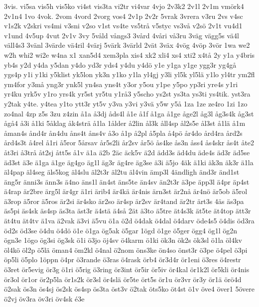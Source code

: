 {3vis.
vi5sa
vis5h
vis5ko
vi4st
vis3ta
vi2tr
vi4var
4vjo
2v3k2
2v1l
2v1m
vm^^f6rk4
2v1n4
1vo
4vok.
2vom
4vord
2vorg
vos4
2v1p
2v2r
5vrak
3vrera
v3ru
2vs
v4sc
v1s2k
v2skri
vs4mi
v3sni
v2so
v1st
vs4te
vs5tr^^e5
v5styc
vs3v^^e5
v2s^^f6
2v1t
vu4d1
v1und
4v5up
4vut
2v1v
3vy
5v^^e5ld
v^^e5ngs3
3v^^e5rd
4v^^e5ri
v^^e53ru
3v^^e4g
v^^e4gg5s
v^^e44l
v^^e4ll4s3
3v^^e4nl
3v^^e4rde
v^^e44ril
4v^^e4rj
5v^^e4rk
3v^^e4rld
2v^^e4t
3v^^e4x
4v^^f6g
4v^^f6p
3v^^f6r
1wa
we2
w2h
whi2
wi2e
w4na
x1
xan5d4
xem3pla
xis4
xk2
xli4
xs4
xti2
x4t^^e5
2y
y1a
y4bris
yb4s
y2d
y4da
y5dan
y4do
yd3r
yds4
y4du
y4d^^f6
y1e
y1ga
y1ge
ygg3r
yg4g^^e5
ygs4p
y1i
y1ki
y5klist
yk5lon
yk3n
y1ko
y1la
yl4gj
y3li
yl5k
yl5l^^e4
y1lo
yl4tr
ym2fl
ym4for
y3m^^e5
yng3r
ynk5l
yn4sa
yns4t
y3or
y5ou
y1pe
y5po
yp3ri
yre4s
y1ri
yr4ku
yrk5v
y1ro
yrs4k
yr5st
yr5tu
y1r^^e53
y5scho
ys2st
ys3ta
ys3ti
ys4tik.
yst3ra
y2tak
y4te.
y4tea
y1to
ytt3r
yt5v
y3va
y3vi
y3v^^e4
y5w
y5^^e5
1za
1ze
ze4ro
1zi
1zo
zo4nal
4zp
z5s
3zu
z4zin
^^e51a
^^e53dj
^^e5ds4l
^^e51e
^^e51f
^^e51ga
^^e51ge
^^e5ge2l
^^e5g3l
^^e5g3s4k
^^e5g3st
^^e5g^^e54
^^e53i
^^e51ki
5^^e5klag
^^e5k4str^^e4
^^e51la
1^^e5lder
^^e52lin
^^e5l3k
^^e5ll4sp
^^e5l2s5e
^^e5l3st
^^e51l^^e4
^^e51m
^^e5man4s
^^e5nd4r
^^e5n4du
^^e5ns4t
^^e5ns4v
^^e53o
^^e51p
^^e52pl
^^e55pla
^^e54p^^f6
^^e5r4do
^^e5rd4ra
^^e5rd2s
^^e5rd4s3t
^^e54rel
^^e51ri
^^e55ror
5^^e5rsav
^^e5r5s2li
^^e5r2sv
^^e5r5^^f6
^^e5s4ke
^^e5s3n
^^e5ss4
^^e5s4skr
^^e5s4t
^^e5te2
^^e5t3ri
^^e53tr^^e5
^^e5t2sj
^^e5tt5s
^^e51v
^^e41a
^^e42b
2^^e4c
^^e4ck5v
^^e42d
^^e4dd3s
^^e4d4du
^^e4de4s
^^e4d3r
^^e4d5se
^^e4d3st
^^e43e
^^e41ga
^^e41ge
^^e4g4go
^^e4g1l
^^e4g3r
^^e4g4re
^^e4g3se
^^e43i
^^e45jo
4^^e4k
^^e41ki
^^e4k3n
^^e4k3r
^^e41la
^^e4l4pap
^^e4l4seg
^^e4ls5kog
^^e4l4slu
^^e4l2t3r
^^e4l2tu
^^e4l4vin
^^e4mp3l
4^^e4ndligh
^^e4nd3r
^^e4nd1st
^^e4ng5r
^^e4nni3s
^^e4nn3s
^^e44no
^^e4ns1l
^^e4n4st
^^e4ns5te
^^e4n4sv
^^e4n2t3r
^^e43pe
^^e4pp3l
^^e44pr
^^e4p4st
^^e44rap
^^e4r2bre
^^e4rg5l
^^e4r4gr
^^e41ri
^^e4rib4
^^e4r4k^^e4
^^e4r4nis
^^e4rn3st
^^e4r2n^^e5
^^e4r4n^^f6
^^e4r5ob
^^e45rol
^^e43rop
^^e45ror
^^e45ros
^^e4r2si
^^e4r4sko
^^e4r2so
^^e4r4sp
^^e4r2sv
^^e4r4tand
^^e4r2tr
^^e4rt3s
4^^e4s
^^e4s3pa
^^e4s5pi
^^e4s4sk
^^e4s4sp
^^e4s3ta
^^e4st3r
^^e44st^^e4
^^e44s^^e5
2^^e4t
^^e43to
^^e45tre
^^e4t4s3k
^^e4t5te
^^e4t4top
^^e4tt3r
^^e4t4tu
^^e4t4tv
^^e41va
^^e42vak
^^e43vi
^^e45vu
^^f61a
^^f62d
^^f64dak
^^f64dal
^^f64darv
^^f6de4s5
^^f64dis
^^f6d3ra
^^f6d2s
^^f6d3se
^^f64du
^^f64d^^f6
^^f61e
^^f61ga
^^f6g5ak
^^f65gar
1^^f6gd
^^f61ge
^^f65ger
^^f6gg4
^^f6g1l
^^f6g2n
^^f6gn3e
1^^f6go
^^f6g3si
^^f6g3sk
^^f61i
^^f63jo
^^f6j4sv
^^f64karm
^^f61ki
^^f6k3n
^^f6k2s
^^f6k3sl
^^f61la
^^f6l4kv
^^f6l4k^^f6
^^f6l2p
^^f65l^^e4
^^f6man4
^^f6m2kl
^^f64nal
^^f62nom
^^f6ns3ke
^^f6n4so
^^f6nst3r
^^f63pe
^^f64pel
^^f63pi
^^f6p5li
^^f65plo
1^^f6ppn
^^f64pr
^^f63rande
^^f63ras
^^f64rask
^^f6rb4
^^f6r3d4r
^^f6r1eni
^^f63res
^^f64restr
^^f63ret
^^f6r5evig
^^f6r3g
^^f61ri
^^f65rig
^^f63ring
^^f6r3int
^^f6r5ir
^^f6r5iv
^^f6r4kal
^^f6r1k2l
^^f6r5kli
^^f6r4nis
^^f6r3ol
^^f6r1or
^^f6r2p5la
^^f6r1s2k
^^f6r3sl
^^f6r4sl^^e4
^^f6r5te
^^f6rt5s
^^f6r1u
^^f6r3vr
^^f6r3y
^^f6r1^^e4
^^f6r^^f64d
^^f62sak
^^f6s3n
^^f6s4sj
^^f6s2sk
^^f6s4sp
^^f6s3ta
^^f6st3v
^^f62tak
^^f6ts5ko
^^f6t4st
^^f61v
^^f6ve4
^^f6ver1
5^^f6vere
^^f62vj
^^f6v3ra
^^f6v3ri
^^f6v4sk
^^e93e
}

